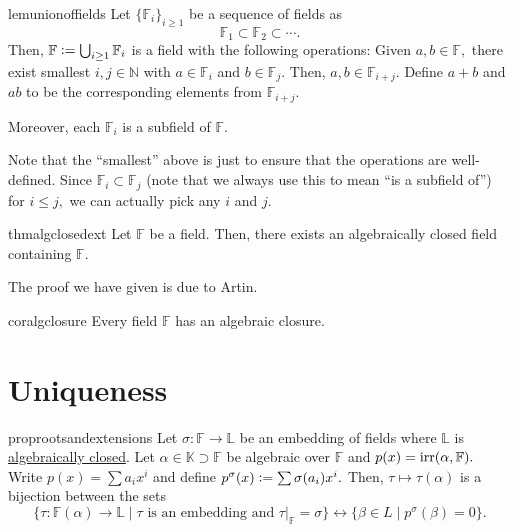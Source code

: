 \begin{restatable}[]{lem}{unionoffields}
\label{lem:unionoffields}
    Let $\{\mathbb{F}_i\}_{i \ge 1}$ be a sequence of fields as
    \begin{equation*} 
        \mathbb{F}_1 \subset \mathbb{F}_2 \subset \cdots.
    \end{equation*}
    Then, $\mathbb{F} \vcentcolon= \bigcup_{i \ge 1}\mathbb{F}_i$ is a field with the following operations:
    Given $a, b \in \mathbb{F},$ there exist smallest $i, j \in \mathbb{N}$ with $a \in \mathbb{F}_i$ and $b \in \mathbb{F}_j.$ Then, $a, b \in \mathbb{F}_{i + j}.$ Define $a + b$ and $ab$ to be the corresponding elements from $\mathbb{F}_{i + j}.$

    Moreover, each $\mathbb{F}_i$ is a subfield of $\mathbb{F}.$ \hfill\hyperref[lem:unionoffields2]{\downsym}
\end{restatable}

Note that the ``smallest'' above is just to ensure that the operations are well-defined. Since $\mathbb{F}_i \subset \mathbb{F}_j$ (note that we always use this to mean ``is a subfield of'') for $i \le j,$ we can actually pick any $i$ and $j.$

\begin{restatable}{thm}{algclosedext}
\label{thm:algclosedext}
    Let $\mathbb{F}$ be a field. Then, there exists an algebraically closed field containing $\mathbb{F}.$ \hfill\hyperref[thm:algclosedext2]{\downsym}
\end{restatable}
The proof we have given is due to Artin.

\begin{restatable}{cor}{algclosure}
\label{cor:algclosure}
    Every field $\mathbb{F}$ has an algebraic closure. \hfill\hyperref[cor:algclosure2]{\downsym}
\end{restatable}

\section{Uniqueness}

\begin{restatable}[]{prop}{rootsandextensions}
\label{prop:rootsandextensions}
    Let $\sigma : \mathbb{F} \to \mathbb{L}$ be an embedding of fields where $\mathbb{L}$ is \underline{algebraically closed}. Let $\alpha \in \mathbb{K} \supset \mathbb{F}$ be algebraic over $\mathbb{F}$ and $p(x) = \operatorname{irr}(\alpha, \mathbb{F}).$ \\
    Write $p(x) = \sum a_i x^i$ and define $p^{\sigma}(x) \vcentcolon= \sum \sigma(a_i) x^i.$ Then, $\tau \mapsto \tau(\alpha)$ is a bijection between the sets
    \begin{equation*} 
        \{\tau : \mathbb{F}(\alpha) \to \mathbb{L} \mid \tau \text{ is an embedding and }\tau|_{\mathbb{F}} = \sigma\} \leftrightarrow \{\beta \in L \mid p^{\sigma}(\beta) = 0\}.
    \end{equation*} \hfill\hyperref[prop:rootsandextensions2]{\downsym}
\end{restatable}

